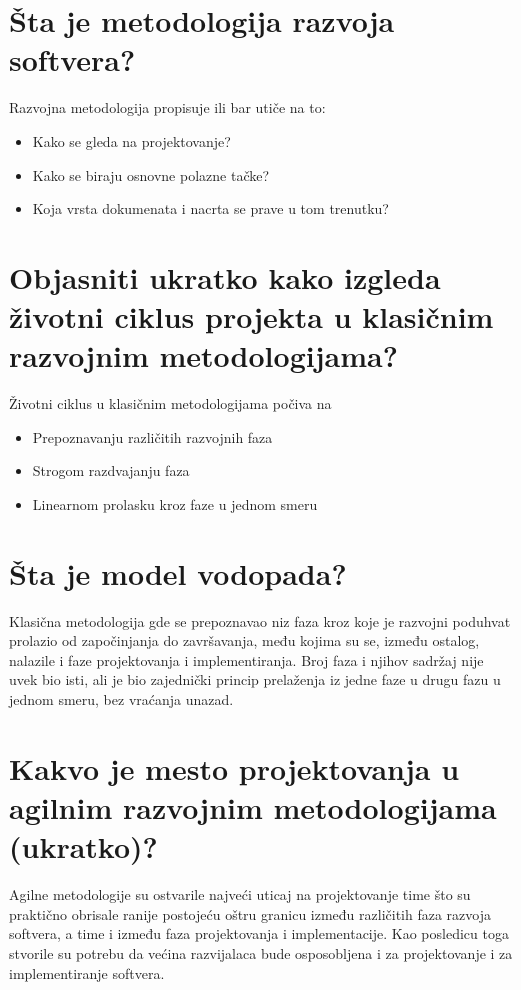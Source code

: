 \documentclass[a4paper]{article}
\begin{document}
\section{Šta je metodologija razvoja softvera?}
  Razvojna metodologija propisuje ili bar utiče na to:
  \begin{itemize}
    \item Kako se gleda na projektovanje?
    \item Kako se biraju osnovne polazne tačke?
    \item Koja vrsta dokumenata i nacrta se prave u tom trenutku?
  \end{itemize}

\section{Objasniti ukratko kako izgleda životni ciklus projekta u klasičnim razvojnim metodologijama?}
  Životni ciklus u klasičnim metodologijama počiva na
  \begin{itemize}
    \item Prepoznavanju različitih razvojnih faza
    \item Strogom razdvajanju faza
    \item Linearnom prolasku kroz faze u jednom smeru
  \end{itemize}

\section{Šta je model vodopada?}
  Klasična metodologija gde se prepoznavao niz faza kroz koje je razvojni poduhvat prolazio od započinjanja do završavanja, među kojima su se, između ostalog, nalazile i faze projektovanja i implementiranja. Broj faza i njihov sadržaj nije uvek bio isti, ali je bio zajednički princip prelaženja iz jedne faze u drugu fazu u jednom smeru, bez vraćanja unazad.

\section{Kakvo je mesto projektovanja u agilnim razvojnim metodologijama (ukratko)?}
  Agilne metodologije su ostvarile najveći uticaj na projektovanje time što su praktično obrisale ranije postojeću oštru granicu između različitih faza razvoja softvera, a time i između faza projektovanja i implementacije. Kao posledicu toga stvorile su potrebu da većina razvijalaca bude osposobljena i za projektovanje i za implementiranje softvera.
\end{document}
